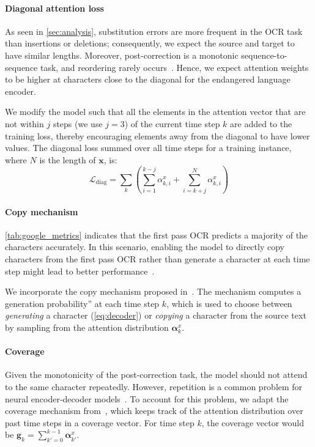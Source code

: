 \paragraph{Diagonal attention loss} As seen in \autoref{sec:analysis}, substitution errors are more frequent in the OCR task than insertions or deletions; consequently, we expect the source and target to have similar lengths. Moreover, post-correction is a monotonic sequence-to-sequence task, and reordering rarely occurs~\cite{schnober-etal-2016-still}. 
Hence, we expect attention weights to be higher at characters close to the diagonal for the endangered language encoder.

We modify the model such that all the elements in the attention vector that are not within $j$ steps (we use $j=3$) of the current time step $k$ are added to the training loss, thereby encouraging elements away from the diagonal to have lower values. The diagonal loss summed over all time steps for a training instance, where $N$ is the length of $\boldsymbol{x}$, is:
$$\mathcal{L}_\mathrm{diag} = \sum_k \left(\sum_{i=1}^{k-j} \alpha^x_{k,i} + \sum_{i=k+j}^N \alpha^x_{k,i}\right)$$

\paragraph{Copy mechanism} \autoref{tab:google_metrics} indicates that the first pass OCR predicts a majority of the characters accurately. In this scenario, enabling the model to directly copy characters from the first pass OCR rather than generate a character at each time step might lead to better performance~\cite{gu-etal-2016-incorporating}.

We incorporate the copy mechanism proposed in~\citet{see-etal-2017-get}. The mechanism computes a \ba\ba generation probability'' at each time step $k$, which is used to choose between \emph{generating} a character (\autoref{eq:decoder}) or \emph{copying} a character from the source text by sampling from the attention distribution $\boldsymbol{\alpha}_k^x$.

\paragraph{Coverage} Given the monotonicity of the post-correction task, the model should not attend to the same character repeatedly. However, repetition is a common problem for neural encoder-decoder models~\cite{mi-etal-2016-coverage,tu-etal-2016-modeling}. To account for this problem, we adapt the coverage mechanism from~\citet{see-etal-2017-get}, which keeps track of the attention distribution over past time steps in a coverage vector. For time step $k$, the coverage vector would be $\mathbf{g}_k = \sum_{k'=0}^{k-1} \boldsymbol{\alpha}^x_{k'}$. 

